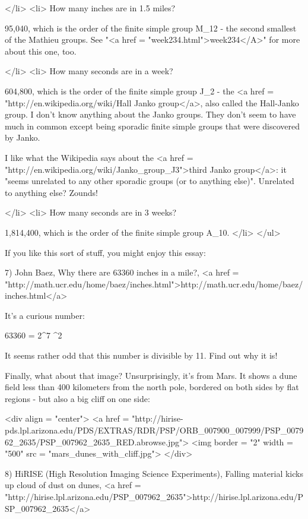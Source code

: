 </li>
<li>
How many inches are in 1.5 miles?  

95,040, which is the order of the finite simple group M_{12} -
the second smallest of the Mathieu groups.  See
"<a href = "week234.html">week234</A>" for more about this
one, too.

</li>
<li>
How many seconds are in a week?  

604,800, which is the order of the finite simple group J_{2} -
the <a href = "http://en.wikipedia.org/wiki/Hall%
Janko group</a>, also called the Hall-Janko group.  I don't know anything about
the Janko groups.  They don't seem to have much in common except being
sporadic finite simple groups that were discovered by Janko. 

I like
what the Wikipedia says about the <a href = "http://en.wikipedia.org/wiki/Janko_group_J3">third Janko group</a>: it "seems unrelated
to any other sporadic groups (or to anything else)".  Unrelated
to anything else?  Zounds!

</li>
<li>
How many seconds are in 3 weeks?  

1,814,400, which is the order of the finite simple group A_{10}.
</li>
</ul>

If you like this sort of stuff, you might enjoy this essay:

7) John Baez, Why there are 63360 inches in a mile?, <a href =
"http://math.ucr.edu/home/baez/inches.html">http://math.ucr.edu/home/baez/inches.html</a>

It's a curious number:

63360 = 2^{7} ^{2}  

It seems rather odd that this number is divisible by 11.
Find out why it is!  

Finally, what about that image?  Unsurprisingly, it's from Mars.  It
shows a dune field less than 400 kilometers from the north pole,
bordered on both sides by flat regions - but also a big cliff on one
side:

<div align = "center">
<a href = "http://hirise-pds.lpl.arizona.edu/PDS/EXTRAS/RDR/PSP/ORB_007900_007999/PSP_007962_2635/PSP_007962_2635_RED.abrowse.jpg">
<img border = "2" width = "500" src = "mars_dunes_with_cliff.jpg">
</div>

8) HiRISE (High Resolution Imaging Science Experiments), 
Falling material kicks up cloud of dust on dunes,
<a href = "http://hirise.lpl.arizona.edu/PSP_007962_2635">http://hirise.lpl.arizona.edu/PSP_007962_2635</a>

